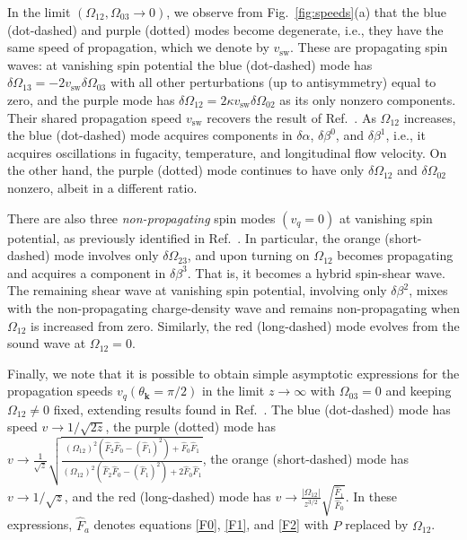 \documentclass[12pt,aps,prd,nofootinbib,noshowkeys,noshowpacs,longbibliography,
superscriptaddress,tightenlines,floatfix,preprintnumbers]{revtex4-2}
\begin{document}
In the limit $(\Omega_{12}, \Omega_{03}\rightarrow 0)$, we observe from Fig.~\ref{fig:speeds}(a) that the blue (dot-dashed) and purple (dotted) modes become degenerate, i.e., they have the same speed of propagation, which we denote by $v_\text{sw}$. These are propagating spin waves: at vanishing spin potential the blue (dot-dashed) mode has $\delta \Omega_{13} = -2v_\text{sw}\delta \Omega_{03}$ with all other perturbations (up to antisymmetry) equal to zero, and the purple mode has $\delta \Omega_{12}=2\kappa v_\text{sw} \delta \Omega_{02}$ as its only nonzero components. Their shared propagation speed $v_\text{sw}$ recovers the result of Ref.~\cite{Ambrus:2022yzz}. As $\Omega_{12}$ increases, the blue (dot-dashed) mode acquires components in $\delta \alpha$, $\delta \beta^0$, and $\delta \beta^1$, i.e., it acquires oscillations in fugacity, temperature, and longitudinal flow velocity. On the other hand, the purple (dotted) mode continues to have only $\delta \Omega_{12}$ and $\delta \Omega_{02}$ nonzero, albeit in a different ratio.






There are also three \emph{non-propagating} spin modes $(v_q=0)$ at vanishing spin potential, as previously identified in Ref.~\cite{Ambrus:2022yzz}. In particular, the orange (short-dashed) mode involves only $\delta \Omega_{23}$, and upon turning on $\Omega_{12}$ becomes propagating and acquires a component in $\delta \beta^3$. That is, it becomes a hybrid spin-shear wave. The remaining shear wave at vanishing spin potential, involving only $\delta \beta^2$, mixes with the non-propagating charge-density wave and remains non-propagating when $\Omega_{12}$ is increased from zero. Similarly, the red (long-dashed) mode evolves from the sound wave at $\Omega_{12}=0$.

Finally, we note that it is possible to obtain simple asymptotic expressions for the propagation speeds $v_q(\theta_{\bm k}=\pi/2)$ in the limit $z\rightarrow \infty$ with $\Omega_{03}=0$ and keeping $\Omega_{12}\neq 0$ fixed, extending results found in Ref.~\cite{Ambrus:2022yzz}. The blue (dot-dashed) mode has speed $v\rightarrow 1/\sqrt{2z}$, the purple (dotted) mode has $v\rightarrow \frac{1}{\sqrt z}\sqrt{\frac{(\Omega_{12})^2(\hat F_2 \hat F_0-(\hat F_1)^2) + \hat F_0 \hat F_1}{(\Omega_{12})^2(\hat F_2 \hat F_0-(\hat F_1)^2) + 2\hat F_0 \hat F_1}}$, the orange (short-dashed) mode has $v\rightarrow 1/\sqrt{z}$, and the red (long-dashed) mode has $v\rightarrow \frac{|\Omega_{12}|}{z^{3/2}}\sqrt{\frac{\hat F_1}{\hat F_0}}$. In these expressions, $\hat F_a$ denotes equations \eqref{F0}, \eqref{F1}, and \eqref{F2} with $P$ replaced by $\Omega_{12}$.
\end{document}
